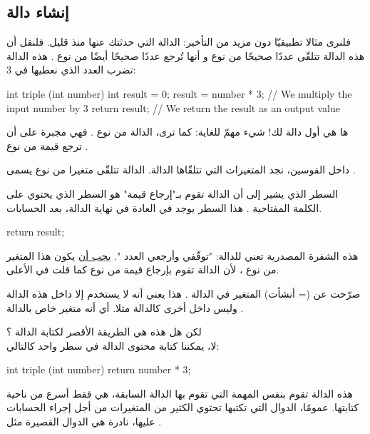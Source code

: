 \subsection{إنشاء دالة}

فلنرى مثالا تطبيقيّا دون مزيد من التأخير: الدالة 
التي حدثتك عنها منذ قليل. فلنقل أن هذه الدالة تتلقّى عددًا صحيحًا من نوع 
و أنها تُرجع عددًا صحيحًا أيضًا من نوع 
.
هذه الدالة تضرب العدد الذي نعطيها في 3:

\begin{Csource}
int triple (int number)
{
	int result = 0;
	result = number * 3; // We multiply the input number by 3
	return result; // We return the result as an output value
}
\end{Csource}

ها هي أول دالة لك! شيء مهمّ للغاية: كما ترى، الدالة من نوع
.
فهي مجبرة على  أن ترجع قيمة من نوع
.

داخل القوسين، نجد المتغيرات التي تتلقّاها الدالة. الدالة 
تتلقّى متغيرا من نوع 
يسمى 
.

السطر الذي يشير إلى أن الدالة تقوم بـ"إرجاع قيمة" هو السطر الذي يحتوي على الكلمة المفتاحية 
.
هذا السطر يوجد في العادة في نهاية الدالة، بعد الحسابات.

\begin{Csource}
return result;
\end{Csource}

هذه الشفرة المصدرية تعني للدالة: "توقّفي وأرجعي العدد 
".
\underline{يجب أن}
يكون هذا المتغير
من نوع
،
لأن الدالة تقوم بإرجاع قيمة من نوع
كما قلت في الأعلى.

صرّحت عن (= أنشأت) المتغير 
في الدالة 
.
هذا يعني أنه لا يستخدم إلا داخل هذه الدالة وليس داخل أخرى كالدالة
مثلا. أي أنه متغير خاص بالدالة 
.

لكن هل هذه هي الطريقة الأقصر لكتابة الدالة
؟\\
لا، يمكننا كتابة محتوى الدالة في سطر واحد كالتالي:

\begin{Csource}
int triple (int number)
{
	return number * 3;
}
\end{Csource}

هذه الدالة تقوم بنفس المهمة التي تقوم بها الدالة السابقة، هي فقط أسرع من ناحية كتابتها. عمومًا، الدوال التي تكتبها تحتوي الكثير من المتغيرات من أجل إجراء الحسابات عليها، نادرة هي الدوال القصيرة مثل
.

